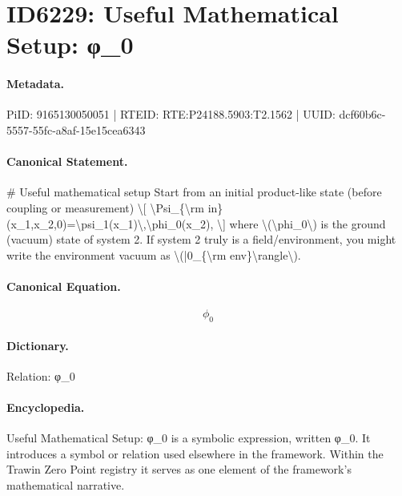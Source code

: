 \section*{ID6229: Useful Mathematical Setup: φ\_0}
\paragraph{Metadata.}
PiID: 9165130050051 | RTEID: RTE:P24188.5903:T2.1562 | UUID: dcf60b6c-5557-55fc-a8af-15e15cea6343

\paragraph{Canonical Statement.}
\# Useful mathematical setup Start from an initial product-like state (before coupling or measurement) \textbackslash{}[ \textbackslash{}Psi\_\{\textbackslash{}rm in\}(x\_1,x\_2,0)=\textbackslash{}psi\_1(x\_1)\textbackslash{},\textbackslash{}phi\_0(x\_2), \textbackslash{}] where \textbackslash{}(\textbackslash{}phi\_0\textbackslash{}) is the ground (vacuum) state of system 2. If system 2 truly is a field/environment, you might write the environment vacuum as \textbackslash{}(|0\_\{\textbackslash{}rm env\}\textbackslash{}rangle\textbackslash{}).

\paragraph{Canonical Equation.}
\[
\phi_0
\]

\paragraph{Dictionary.}
Relation: φ\_0

\paragraph{Encyclopedia.}
Useful Mathematical Setup: φ\_0 is a symbolic expression, written φ\_0. It introduces a symbol or relation used elsewhere in the framework. Within the Trawin Zero Point registry it serves as one element of the framework's mathematical narrative.
